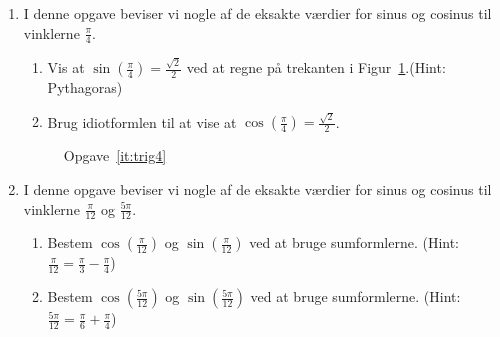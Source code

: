 \begin{enumerate}
		\item \label{it:trig4} I denne opgave beviser vi nogle af de eksakte værdier for sinus og cosinus til vinklerne $ \frac{\pi}{4}$.
		\begin{enumerate}
			\item Vis at $\sin(\frac{\pi}{4})=\frac{\sqrt{2}}{2}$ ved at regne på trekanten i Figur~\ref{fig:trig4}.(Hint: Pythagoras) 
			\item Brug idiotformlen til at vise at $\cos(\frac{\pi}{4})=\frac{\sqrt{2}}{2}$. 
		\end{enumerate}
	
	\begin{figure}
		\centering
		\caption{Opgave~\ref{it:trig4}}
		\label{fig:trig4}
	\end{figure}

	\item \label{it:trig5}I denne opgave beviser vi nogle af de eksakte værdier for sinus og cosinus til vinklerne $ \frac{\pi}{12}$ og $ \frac{5\pi}{12} $.
	\begin{enumerate}
		\item Bestem $\cos(\frac{\pi}{12})$ og $\sin(\frac{\pi}{12})$ ved at bruge sumformlerne. (Hint: $ \frac{\pi}{12}=\frac{\pi}{3}-\frac{\pi}{4} $)
		\item  Bestem $\cos(\frac{5\pi}{12})$ og $\sin(\frac{5\pi}{12})$ ved at bruge sumformlerne. (Hint: $ \frac{5\pi}{12}=\frac{\pi}{6}+\frac{\pi}{4} $)
	\end{enumerate}
	

\end{enumerate}
